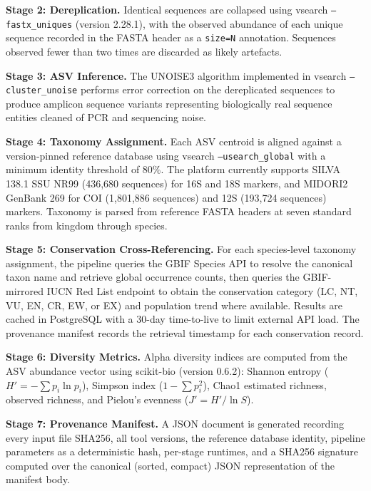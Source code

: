 \documentclass[runningheads]{llncs}
\begin{document}
\textbf{Stage 2: Dereplication.} Identical sequences are collapsed using vsearch \texttt{--fastx\_uniques} (version 2.28.1), with the observed abundance of each unique sequence recorded in the FASTA header as a \texttt{size=N} annotation. Sequences observed fewer than two times are discarded as likely artefacts.

\textbf{Stage 3: ASV Inference.} The UNOISE3 algorithm \cite{edgar2016} implemented in vsearch \texttt{--cluster\_unoise} performs error correction on the dereplicated sequences to produce amplicon sequence variants representing biologically real sequence entities cleaned of PCR and sequencing noise.

\textbf{Stage 4: Taxonomy Assignment.} Each ASV centroid is aligned against a version-pinned reference database using vsearch \texttt{--usearch\_global} with a minimum identity threshold of 80\%. The platform currently supports SILVA 138.1 SSU NR99 \cite{quast2013} (436,680 sequences) for 16S and 18S markers, and MIDORI2 GenBank 269 \cite{leray2022} for COI (1,801,886 sequences) and 12S (193,724 sequences) markers. Taxonomy is parsed from reference FASTA headers at seven standard ranks from kingdom through species.

\textbf{Stage 5: Conservation Cross-Referencing.} For each species-level taxonomy assignment, the pipeline queries the GBIF Species API to resolve the canonical taxon name and retrieve global occurrence counts, then queries the GBIF-mirrored IUCN Red List endpoint to obtain the conservation category (LC, NT, VU, EN, CR, EW, or EX) and population trend where available. Results are cached in PostgreSQL with a 30-day time-to-live to limit external API load. The provenance manifest records the retrieval timestamp for each conservation record.

\textbf{Stage 6: Diversity Metrics.} Alpha diversity indices are computed from the ASV abundance vector using scikit-bio (version 0.6.2): Shannon entropy ($H' = -\sum p_i \ln p_i$), Simpson index ($1 - \sum p_i^2$), Chao1 estimated richness, observed richness, and Pielou's evenness ($J' = H' / \ln S$).

\textbf{Stage 7: Provenance Manifest.} A JSON document is generated recording every input file SHA256, all tool versions, the reference database identity, pipeline parameters as a deterministic hash, per-stage runtimes, and a SHA256 signature computed over the canonical (sorted, compact) JSON representation of the manifest body.
\end{document}
